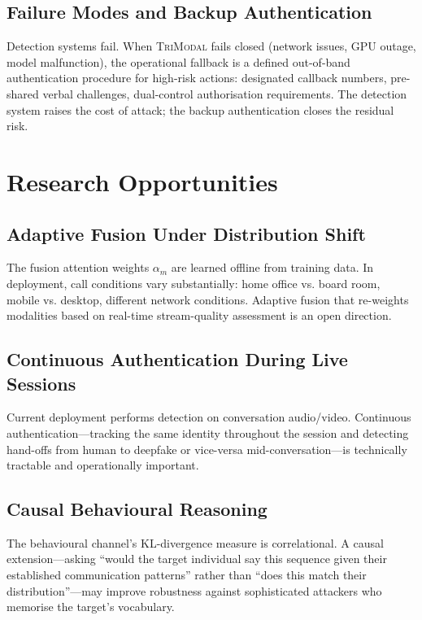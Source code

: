 \documentclass[sigconf,nonacm]{acmart}
\begin{document}
\subsection{Failure Modes and Backup Authentication}

Detection systems fail. When \textsc{TriModal} fails closed (network
issues, GPU outage, model malfunction), the operational fallback is a
defined out-of-band authentication procedure for high-risk actions:
designated callback numbers, pre-shared verbal challenges, dual-control
authorisation requirements. The detection system raises the cost of
attack; the backup authentication closes the residual risk.

\section{Research Opportunities}

\subsection{Adaptive Fusion Under Distribution Shift}

The fusion attention weights $\alpha_m$ are learned offline from
training data. In deployment, call conditions vary substantially:
home office vs. board room, mobile vs. desktop, different network
conditions. Adaptive fusion that re-weights modalities based on
real-time stream-quality assessment is an open direction.

\subsection{Continuous Authentication During Live Sessions}

Current deployment performs detection on conversation audio/video.
Continuous authentication---tracking the same identity throughout
the session and detecting hand-offs from human to deepfake or
vice-versa mid-conversation---is technically tractable and
operationally important.

\subsection{Causal Behavioural Reasoning}

The behavioural channel's KL-divergence measure is correlational. A
causal extension---asking ``would the target individual say this
sequence given their established communication patterns'' rather than
``does this match their distribution''---may improve robustness against
sophisticated attackers who memorise the target's vocabulary.
\end{document}
